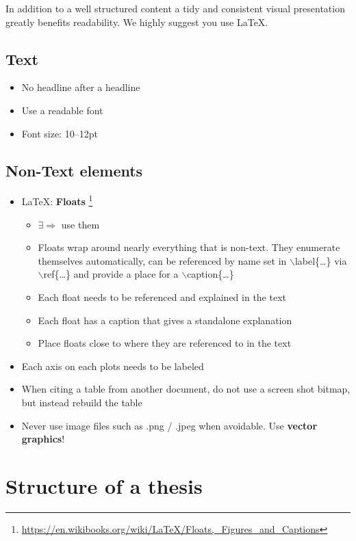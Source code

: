 \documentclass[twocolumn]{mlai-guide}
\begin{document}
In addition to a well structured content a tidy and consistent visual presentation greatly benefits readability. We highly suggest you use \LaTeX.

\subsection{Text}
\begin{itemize}
	\item No headline after a headline
	\item Use a readable font
	\item Font size: 10--12pt
\end{itemize}

\subsection{Non-Text elements}

\begin{itemize}
	\item \LaTeX: \textbf{Floats} \footnote{\href{https://en.wikibooks.org/wiki/LaTeX/Floats,_Figures_and_Captions}{https://en.wikibooks.org/wiki/LaTeX/Floats,\_Figures\_and\_Captions}}
	\begin{itemize}
		\item $\exists \Rightarrow$ use them
		\item Floats wrap around nearly everything that is non-text. They enumerate themselves automatically, can be referenced by name set in $\backslash$label\{\dots\} via $\backslash $ref\{\dots\} and provide a place for a $\backslash$caption\{\dots\}
		\item Each float needs to be referenced and explained in the text
		\item Each float has a caption that gives a standalone explanation
		\item Place floats close to where they are referenced to in the text
	\end{itemize}
	\item Each axis on each plots needs to be labeled
	\item When citing a table from another document, do not use a screen shot bitmap, but instead rebuild the table 
	\item Never use image files such as .png / .jpeg when avoidable. Use \textbf{vector graphics}!
\end{itemize}

\section{Structure of a thesis} \label{sec:structure}
\end{document}
